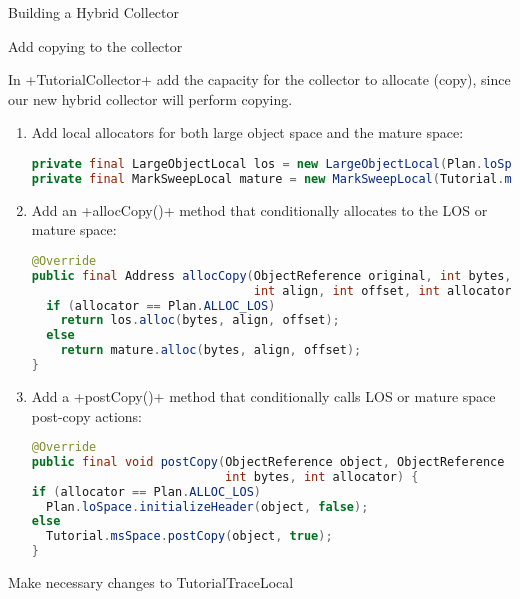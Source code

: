 \begin{section}{Building a Hybrid Collector}
\begin{subsection}{Add copying to the collector}

In \spverb+TutorialCollector+ add the capacity for the collector to allocate (copy), since our new hybrid collector will perform copying.

\begin{enumerate}
  \item Add local allocators for both large object space and the mature space:
    \begin{lstlisting}[language=Java]
private final LargeObjectLocal los = new LargeObjectLocal(Plan.loSpace);
private final MarkSweepLocal mature = new MarkSweepLocal(Tutorial.msSpace);
    \end{lstlisting}
  \item Add an \spverb+allocCopy()+ method that conditionally allocates to the LOS or mature space:
    \begin{lstlisting}[language=Java]
@Override
public final Address allocCopy(ObjectReference original, int bytes,
                               int align, int offset, int allocator) {
  if (allocator == Plan.ALLOC_LOS)
    return los.alloc(bytes, align, offset);
  else
    return mature.alloc(bytes, align, offset);
}
    \end{lstlisting}
  \item Add a \spverb+postCopy()+ method that conditionally calls LOS or mature space post-copy actions:
    \begin{lstlisting}[language=Java]
@Override
public final void postCopy(ObjectReference object, ObjectReference typeRef,
                           int bytes, int allocator) {
if (allocator == Plan.ALLOC_LOS)
  Plan.loSpace.initializeHeader(object, false);
else
  Tutorial.msSpace.postCopy(object, true);
}
    \end{lstlisting}
\end{enumerate}

\end{subsection}

\begin{subsection}{Make necessary changes to TutorialTraceLocal}


\end{subsection}
\end{section}
